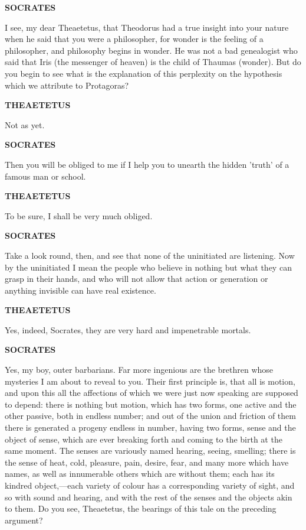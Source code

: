 \documentclass[11pt,letter]{article}
\begin{document}
\par \textbf{SOCRATES}
\par   I see, my dear Theaetetus, that Theodorus had a true insight into your nature when he said that you were a philosopher, for wonder is the feeling of a philosopher, and philosophy begins in wonder. He was not a bad genealogist who said that Iris (the messenger of heaven) is the child of Thaumas (wonder). But do you begin to see what is the explanation of this perplexity on the hypothesis which we attribute to Protagoras?

\par \textbf{THEAETETUS}
\par   Not as yet.

\par \textbf{SOCRATES}
\par   Then you will be obliged to me if I help you to unearth the hidden 'truth' of a famous man or school.

\par \textbf{THEAETETUS}
\par   To be sure, I shall be very much obliged.

\par \textbf{SOCRATES}
\par   Take a look round, then, and see that none of the uninitiated are listening. Now by the uninitiated I mean the people who believe in nothing but what they can grasp in their hands, and who will not allow that action or generation or anything invisible can have real existence.

\par \textbf{THEAETETUS}
\par   Yes, indeed, Socrates, they are very hard and impenetrable mortals.

\par \textbf{SOCRATES}
\par   Yes, my boy, outer barbarians. Far more ingenious are the brethren whose mysteries I am about to reveal to you. Their first principle is, that all is motion, and upon this all the affections of which we were just now speaking are supposed to depend:  there is nothing but motion, which has two forms, one active and the other passive, both in endless number; and out of the union and friction of them there is generated a progeny endless in number, having two forms, sense and the object of sense, which are ever breaking forth and coming to the birth at the same moment. The senses are variously named hearing, seeing, smelling; there is the sense of heat, cold, pleasure, pain, desire, fear, and many more which have names, as well as innumerable others which are without them; each has its kindred object,—each variety of colour has a corresponding variety of sight, and so with sound and hearing, and with the rest of the senses and the objects akin to them. Do you see, Theaetetus, the bearings of this tale on the preceding argument?
\end{document}
